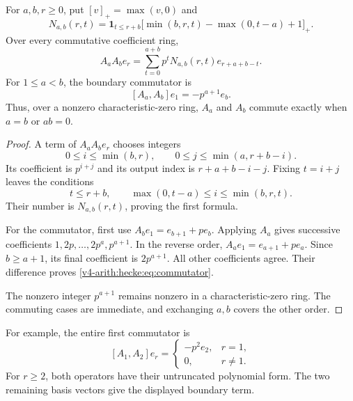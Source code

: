 \begin{theorem}
\label{v4-arith:hecke:thm:composition}
For $a,b,r\geq0$, put $[v]_+=\max(v,0)$ and
\[
 N_{a,b}(r,t)=\mathbf1_{t\leq r+b}
 \bigl[\min(b,r,t)-\max(0,t-a)+1\bigr]_+.
\]
Over every commutative coefficient ring,
\begin{equation}
 \label{v4-arith:hecke:eq:composition}
 A_aA_be_r=\sum_{t=0}^{a+b}p^tN_{a,b}(r,t)e_{r+a+b-t}.
\end{equation}
For $1\leq a<b$, the boundary commutator is
\begin{equation}
 \label{v4-arith:hecke:eq:commutator}
 [A_a,A_b]e_1=-p^{a+1}e_b.
\end{equation}
Thus, over a nonzero characteristic-zero ring, $A_a$ and $A_b$
commute exactly when $a=b$ or $ab=0$.
\end{theorem}
\begin{proof}
A term of $A_aA_be_r$ chooses integers
\[
 0\leq i\leq\min(b,r),\qquad
 0\leq j\leq\min(a,r+b-i).
\]
Its coefficient is $p^{i+j}$ and its output index is $r+a+b-i-j$.
Fixing $t=i+j$ leaves the conditions
\[
 t\leq r+b,\qquad \max(0,t-a)\leq i\leq\min(b,r,t).
\]
Their number is $N_{a,b}(r,t)$, proving the first formula.

For the commutator, first use $A_be_1=e_{b+1}+pe_b$.
Applying $A_a$ gives successive coefficients
$1,2p,\ldots,2p^a,p^{a+1}$.
In the reverse order, $A_ae_1=e_{a+1}+pe_a$.
Since $b\geq a+1$, its final coefficient is $2p^{a+1}$.
All other coefficients agree. Their difference proves
\eqref{v4-arith:hecke:eq:commutator}.

The nonzero integer $p^{a+1}$ remains nonzero in a characteristic-zero
ring. The commuting cases are immediate, and exchanging $a,b$
covers the other order.
\end{proof}

For example, the entire first commutator is
\[
 [A_1,A_2]e_r=
 \begin{cases}-p^2e_2,&r=1,\\0,&r\ne1.\end{cases}
\]
For $r\geq2$, both operators have their untruncated polynomial form.
The two remaining basis vectors give the displayed boundary term.

